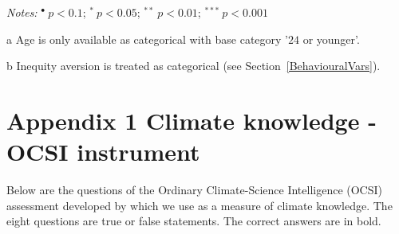 \documentclass[a4paper,12pt]{article}
\begin{document}
{\begin{threeparttable}
\begin{small}
\begin{tabular}{lrcrc}
\hline
\end{tabular} 
\end{small}
 \begin{tablenotes}
  \begin{footnotesize}
  \item \textit{Notes:} \hspace{0.2cm}$^{\bullet}~p<0.1$; $^{*}~p<0.05$; $^{**}~p<0.01$; $^{***}~p<0.001$
  \begin{adjustwidth}{1cm}{}\item[a]Age is only available as categorical with  base category '$24$ or younger'.
\item[b]Inequity aversion is treated as categorical (see Section~\ref{BehaviouralVars}).
     \end{adjustwidth}
\singlespacing
  \end{footnotesize}
\end{tablenotes}
  \end{threeparttable} 
\par}




\newpage




\FloatBarrier









\makeatletter 
\renewcommand{\thesection}{\hspace*{-1.0em}}
\newpage
\linespread{1}



\newpage


\setcounter{table}{0} 
\makeatletter 
\renewcommand{\thetable}{A\@arabic \c@table} 
\FloatBarrier


\section{Appendix 1 Climate knowledge - OCSI instrument}

Below are the questions of the Ordinary Climate-Science Intelligence (OCSI) assessment developed by \cite{Kahan2015} which we use as a measure of climate knowledge. The eight questions are true or false statements. The correct answers are in bold.
\end{document}
